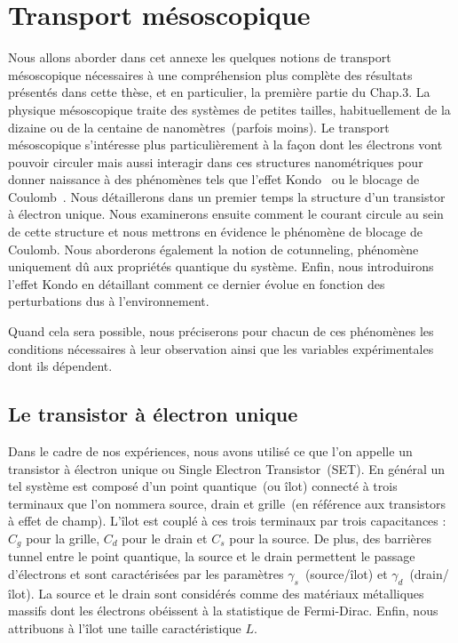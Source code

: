 \chapter{Transport mésoscopique}

Nous allons aborder dans cet annexe les quelques notions de transport mésoscopique nécessaires à une compréhension plus complète des résultats présentés dans cette thèse, et en particulier, la première partie du Chap.3. La physique mésoscopique traite des systèmes de petites tailles, habituellement de la dizaine ou de la centaine de nanomètres~(parfois moins). Le transport mésoscopique s'intéresse plus particulièrement à la façon dont les électrons vont pouvoir circuler mais aussi interagir dans ces structures nanométriques pour donner naissance à des phénomènes tels que l'effet Kondo~\cite{Kondo1964} ou le blocage de Coulomb~\cite{Beenakker1991}. Nous détaillerons dans un premier temps la structure d'un transistor à électron unique. Nous examinerons ensuite comment le courant circule au sein de cette structure et nous mettrons en évidence le phénomène de blocage de Coulomb. Nous aborderons également la notion de cotunneling, phénomène uniquement dû aux propriétés quantique du système. Enfin, nous introduirons l'effet Kondo en détaillant comment ce dernier évolue en fonction des perturbations dus à l'environnement.

Quand cela sera possible, nous préciserons pour chacun de ces phénomènes les conditions nécessaires à leur observation ainsi que les variables expérimentales dont ils dépendent.


\section{Le transistor à électron unique}
Dans le cadre de nos expériences, nous avons utilisé ce que l'on appelle un transistor à électron unique ou Single Electron Transistor~(SET). En général un tel système est composé d'un point quantique~(ou îlot) connecté à trois terminaux que l'on nommera source, drain et grille~(en référence aux transistors à effet de champ). L'\^ilot est couplé à ces trois terminaux par trois capacitances : $C_g$ pour la grille, $C_d$ pour le drain et $C_s$ pour la source. De plus, des barrières tunnel entre le point quantique, la source et le drain permettent le passage d'électrons et sont caractérisées par les paramètres $\gamma_s$~(source/\^ilot) et $\gamma_d$~(drain/\^ilot). La source et le drain sont considérés comme des matériaux métalliques massifs dont les électrons obéissent à la statistique de Fermi-Dirac. Enfin, nous attribuons à l'\^ilot une taille caractéristique $L$. 

